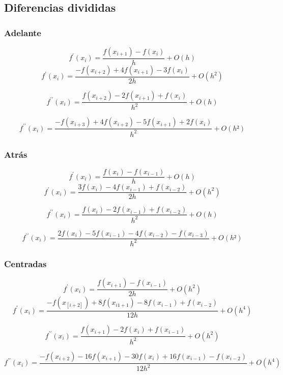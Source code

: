 \begin{multicols}{2}
           \subsection{Diferencias divididas}
           	\subsubsection{Adelante}
            $$
            	f^\prime(x_i) = \frac{f(x_{i+1}) -f(x_i)}{h} + O(h)
            $$
            $$
            	f^\prime(x_i) = \frac{-f(x_{i+2}) + 4f(x_{i+1}) -3f(x_i)}{2h} + O(h^2)
            $$
            
            $$
            	f^{\prime\prime} (x_i) = \frac{f(x_{i+2}) -2f(x_{i+1}) +f(x_i)}{h^2} + O(h)
            $$
            
            $$
            	f^{\prime\prime}(x_i) = \frac{-f(x_{i+3}) + 4f(x_{i+2}) -5f(x_{i+1}) +2f(x_i)}{h^2} + O(h²)
            $$
            \subsubsection{Atrás}
             $$
            	f^\prime(x_i) = \frac{f(x_{i}) -f(x_{i-1})}{h} + O(h)
            $$
            $$
            	f^\prime(x_i) = \frac{3f(x_i) -4f(x_{i-1}) +f(x_{i-2})}{2h} + O(h^2)
            $$
            
            $$
            	f^{\prime\prime} (x_i) = \frac{f(x_{i}) -2f(x_{i-1}) +f(x_{i-2})}{h^2} + O(h)
            $$
            
            $$
            	f^{\prime\prime}(x_i) = \frac{2f(x_{i})-5f(x_{i-1}) -4f(x_{i-2}) -f(x_{i-3})}{h^2} + O(h²)
            $$
            
        \end{multicols}
        
        \subsubsection{Centradas}
              $$
            	f^\prime(x_i) = \frac{f(x_{i+1}) -f(x_{i-1})}{2h} + O(h^2)
            $$
            $$
            	f^\prime(x_i) = \frac{-f(x_[i+2])+8f(x_{i1+1}) -8f(x_{i-1})+f(x_{i-2})}{12h} + O(h^4)
            $$
            
            $$
            	f^{\prime\prime} (x_i) = \frac{f(x_{i+1}) -2f(x_{i}) +f(x_{i-1})}{h^2} + O(h^2)
            $$
            
            $$f^{\prime\prime}(x_i) = \frac{-f(x_{i+2})-16f(x_{i+1}) -30f(x_{i}) +16f(x_{i-1})-f(x_{i-2})}{12h^2} + O(h^4)$$
